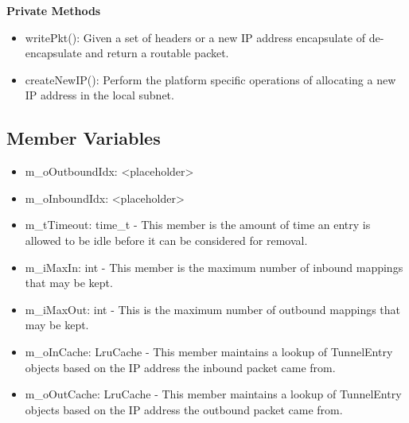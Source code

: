 {\bf Private Methods}
\begin{itemize}
\item writePkt(): Given a set of headers or a new IP address encapsulate of de-encapsulate and return a routable packet.
\item createNewIP(): Perform the platform specific operations of allocating a new IP address in the local subnet.
\end{itemize}

\subsection{Member Variables}
\begin{itemize}
\item m\_oOutboundIdx: <placeholder>
\item m\_oInboundIdx: <placeholder>
\item m\_tTimeout: time\_t - This member is the amount of time an entry is allowed to be idle before it can be considered for removal.
\item m\_iMaxIn: int - This member is the maximum number of inbound mappings that may be kept.
\item m\_iMaxOut: int - This is the maximum number of outbound mappings that may be kept.
\item m\_oInCache: LruCache - This member maintains a lookup of TunnelEntry objects based on the IP address the inbound packet came from.
\item m\_oOutCache: LruCache - This member maintains a lookup of TunnelEntry objects based on the IP address the outbound packet came from.
\end{itemize}
